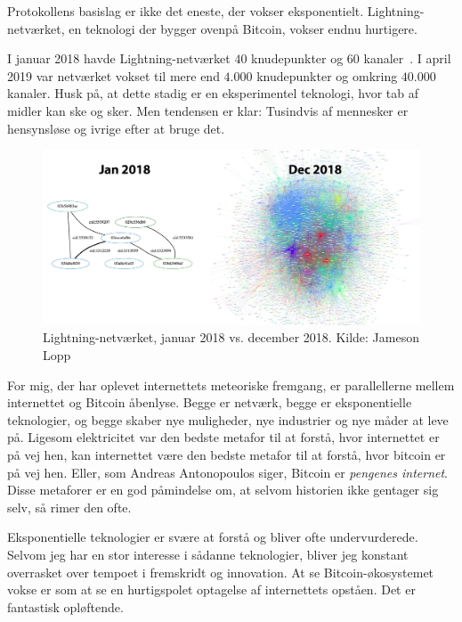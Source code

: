 \documentclass[paper=6in:9in,pagesize=pdftex,
               headinclude=on,footinclude=on,12pt]{scrbook}
\begin{document}
Protokollens basislag er ikke det eneste, der vokser eksponentielt. Lightning-netværket, en teknologi der bygger ovenpå Bitcoin, vokser endnu hurtigere.

I januar 2018 havde Lightning-netværket $40$ knudepunkter og $60$ kanaler~\cite{web:lightning-nodes}. I april 2019 var netværket vokset til mere end $4.000$ knudepunkter og omkring $40.000$ kanaler. Husk på, at dette stadig er en eksperimentel teknologi, hvor tab af midler kan ske og sker. Men tendensen er klar: Tusindvis af mennesker er hensynsløse og ivrige efter at bruge det.\begin{figure}
  \includegraphics{assets/images/lnd-growth-lopp-white.png}
  \caption{Lightning-netværket, januar 2018 vs. december 2018. Kilde: Jameson Lopp}
  \label{fig:lnd-growth-lopp-white.png}
\end{figure}

For mig, der har oplevet internettets meteoriske fremgang, er parallellerne mellem internettet og Bitcoin åbenlyse. Begge er netværk, begge er eksponentielle teknologier, og begge skaber nye muligheder, nye industrier og nye måder at leve på. Ligesom elektricitet var den bedste metafor til at forstå, hvor internettet er på vej hen, kan internettet være den bedste metafor til at forstå, hvor bitcoin er på vej hen. Eller, som Andreas Antonopoulos siger, Bitcoin er \textit{pengenes internet}. Disse metaforer er en god påmindelse om, at selvom historien ikke gentager sig selv, så rimer den ofte.

Eksponentielle teknologier er svære at forstå og bliver ofte undervurderede. Selvom jeg har en stor interesse i sådanne teknologier, bliver jeg konstant overrasket over tempoet i fremskridt og innovation. At se Bitcoin-økosystemet vokse er som at se en hurtigspolet optagelse af internettets opståen. Det er fantastisk opløftende.
\end{document}
